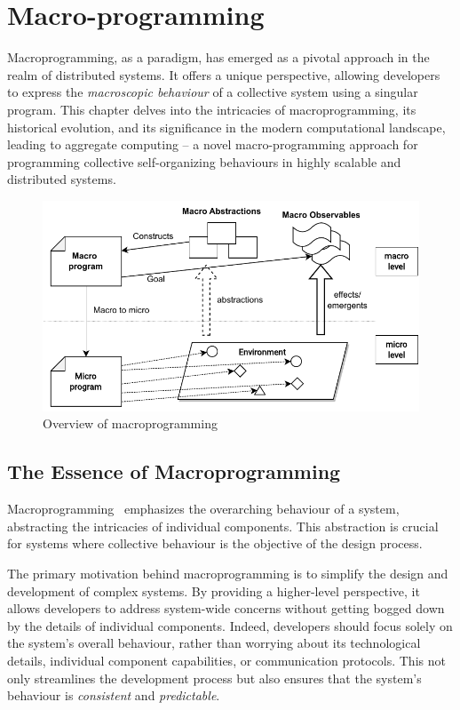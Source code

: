 
\chapter{Macro-programming}\label{chap:macro-programming}%
\minitoc%
\newcommand{\q}[1]{\texttt{#1}}
Macroprogramming, as a paradigm, 
 has emerged as a pivotal approach in the realm of distributed systems. 
%
It offers a unique perspective, 
 allowing developers to express the \emph{macroscopic behaviour} of a collective system using a singular program.
% 
This chapter delves into the intricacies of macroprogramming, 
 its historical evolution, and its significance in the modern computational landscape, 
 leading to aggregate computing -- a novel macro-programming approach for 
 programming collective self-organizing behaviours in highly scalable and distributed systems.

\begin{figure}
\includegraphics[width=\textwidth]{chapters/img/macroprogramming.drawio}
\caption{Overview of macroprogramming}\label{macro:fig:macro-programming}
\end{figure}
\section{The Essence of Macroprogramming}
Macroprogramming~\cite{casadei2023macroprogramming} emphasizes the overarching behaviour of a system, 
 abstracting the intricacies of individual components. 
 This abstraction is crucial for systems where collective behaviour is the objective of the design process.

The primary motivation behind macroprogramming 
 is to simplify the design and development of complex systems. 
 By providing a higher-level perspective, 
 it allows developers to address system-wide concerns without getting bogged down by the details of individual components. 
 Indeed, developers should focus solely on the system's overall behaviour, rather than worrying about its technological details, individual component capabilities, or communication protocols.
This not only streamlines the development process but also ensures that the system's behaviour is \emph{consistent} and \emph{predictable}.


